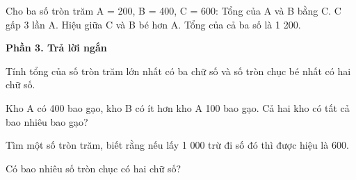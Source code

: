 \begin{ex} %
Cho ba số tròn trăm A = 200, B = 400, C = 600:
\choiceTF
{\True Tổng của A và B bằng C.}
{\True C gấp 3 lần A.}
{Hiệu giữa C và B bé hơn A.}
{\True Tổng của cả ba số là 1 200.}
\end{ex}

\textbf{Phần 3. Trả lời ngắn}

\begin{ex} %
Tính tổng của số tròn trăm lớn nhất có ba chữ số và số tròn chục bé nhất có hai chữ số.
\end{ex}

\begin{ex} %
Kho A có 400 bao gạo, kho B có ít hơn kho A 100 bao gạo. Cả hai kho có tất cả bao nhiêu bao gạo?
\end{ex}

\begin{ex} %
Tìm một số tròn trăm, biết rằng nếu lấy 1 000 trừ đi số đó thì được hiệu là 600.
\end{ex}

\begin{ex} %
Có bao nhiêu số tròn chục có hai chữ số?
\end{ex}


